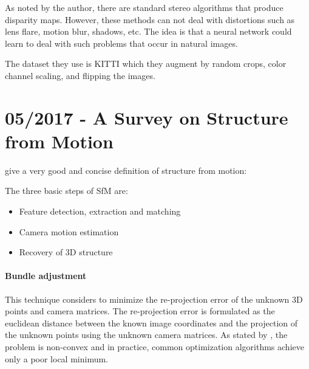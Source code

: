 		As noted by the author, there are standard stereo algorithms that produce disparity maps.
		However, these methods can not deal with distortions such as lens flare, motion blur, shadows, etc.
		The idea is that a neural network could learn to deal with such problems that occur in natural images.
		
		The dataset they use is {KITTI} \cite{Geiger2012KITTI} which they augment by random crops, color channel scaling, and flipping the images.
		
		\section{05/2017 - A Survey on Structure from Motion}
		
			\cite{survey2017} give a very good and concise definition of structure from motion:
			
			
			The three basic steps of SfM are:
			\begin{itemize}
				\item Feature detection, extraction and matching
				\item Camera motion estimation
				\item Recovery of 3D structure
			\end{itemize}
			
			\paragraph{Bundle adjustment} 
				This technique considers to minimize the re-projection error of the unknown 3D points and camera matrices.
				The re-projection error is formulated as the euclidean distance between the known image coordinates and the projection of the unknown points using the unknown camera matrices.
				As stated by \cite{survey2017}, the problem is non-convex and in practice, common optimization algorithms achieve only a poor local minimum.
				
